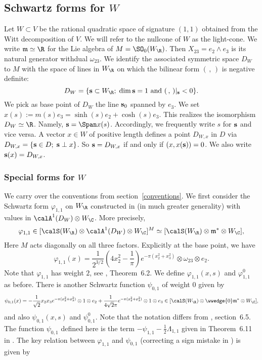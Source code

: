 \subsection{Schwartz forms for $W$}


Let $W\subset V$ be the rational quadratic space of signature  $(1,1)$ obtained from the Witt decomposition of $V$. We will refer to the nullcone of $W$ as the light-cone. We write
$\mathfrak{m} \simeq \R$ for the Lie algebra of $M = \SO_0(W_{\R})$. Then $X_{23} = e_2 \wedge e_3$ is its
natural generator withdual $\omega_{23}$.
We identify the associated symmetric space $D_W$
to $M$ with the space of lines in $W_{\R}$ on which
the bilinear form $(\,,\,)$ is negative definite: \[D_W = \{{\bf s} \subset W_{\R} ; \;\text{$\dim {\bf s} =1$ and $(\,,\,)|_{\bf s} < 0$} \}. \] We pick as base point of $D_W$
the line ${\bf s}_0$ spanned by $e_3$.
We set $ x(s) := m(s) e_3 = \sinh(s) e_2 + \cosh(s) e_3$. This realizes the isomorphism
$D_W \simeq \R$. Namely, ${\bf s} = \Span x(s)$.
Accordingly, we frequently write $s$ for ${\bf s}$ and vice versa.
A vector $x \in W$ of positive length defines a point $D_{W,x}$ in
$D$ via $D_{W,x} = \{ {\bf s} \in D; \; {\bf s} \perp x \}$. So
${\bf s} = D_{W,x}$ if and only if $(x,x({\bf s})) =0$. We also
write ${\bf s}(x)=D_{W,x}$.
\subsubsection{Special forms for $W$}\label{W-forms}

We carry over the conventions from section~\ref{conventions}. We
first consider the Schwartz form $\varphi_{1,1}$ on $W_{\R}$
constructed in \cite{FMcoeff} (in much greater generality) with
values in $\calA^1(D_W) \otimes W_{\C}$. More precisely,
\[
\varphi_{1,1} \in [\calS(W_{\R}) \otimes \calA^1(D_W) \otimes W_{\C}]^M \simeq
[\calS(W_{\R}) \otimes \mathfrak{m}^{\ast} \otimes W_{\C}],
\]
Here $M$ acts diagonally on all three factors. Explicitly at the base point, we have
\begin{equation*}
\varphi_{1,1}(x) = \frac{1}{2^{3/2}} \left(4 x_2^2-\frac1{\pi}\right) e^{-\pi (x_2^2+x_3^2)} \otimes \omega_{23} \otimes e_2.
\end{equation*}
Note that $\varphi_{1,1}$ has weight $2$, see \cite{FMcoeff},
Theorem~6.2. We define $\varphi_{1,1}(x,s)$ and $\varphi_{1,1}^0$
as before. There is another Schwartz function $\psi_{0,1}$ of weight
$0$ given by
\begin{multline*}
\psi_{0,1}(x) =   -\frac1{\sqrt{2}} x_2x_3 e^{-\pi(x_2^2+x_3^2)}  \otimes 1 \otimes e_2 + \frac{1}{4\sqrt{2}\pi} e^{-\pi(x_2^2+x_3^2)} \otimes 1\otimes e_3  \in
[\calS(W_{\R}) \otimes \wwedge{0} \mathfrak{m}^{\ast} \otimes W_{\C}],
\end{multline*}
and also $\psi_{0,1}(x,s)$ and $\psi_{0,1}^0$. Note that the notation
differs from \cite{FMcoeff}, section~6.5. The function $\psi_{0,1}$
defined here is the term $-\psi_{1,1} - \tfrac12 \Lambda_{1,1}$
given in Theorem~6.11 in \cite{FMcoeff}.
The key relation between $\varphi_{1,1}$ and $\psi_{0,1}$ (correcting a sign mistake in \cite{FMcoeff}) is given by

